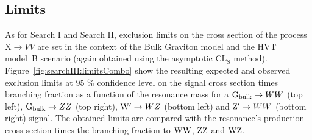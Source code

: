 \subsection{Limits}
As for Search I and Search II, exclusion limits on the cross section of the process $\text{X} \to VV$ are set in the context of the Bulk Graviton model and the HVT model~B scenario (again obtained using the asymptotic $\text{CL}_\text{S}$ method). Figure~\ref{fig:searchIII:limitsCombo} show the resulting expected and observed exclusion limits at 95 \% confidence level on the signal cross section times branching fraction as a function of the resonance mass for a $\mathrm{G}_\mathrm{bulk}\rightarrow WW$ (top left), $\mathrm{G}_\mathrm{bulk}\rightarrow ZZ$ (top right), $\mathrm{W}^\prime\rightarrow WZ$ (bottom left) and $\mathrm{Z}^\prime\rightarrow WW$ (bottom right) signal. The obtained limits are compared with the resonance's production cross section times the branching fraction to $\mathrm{W}\mathrm{W}$, $\mathrm{Z}\mathrm{Z}$ and $\mathrm{W}\mathrm{Z}$.
